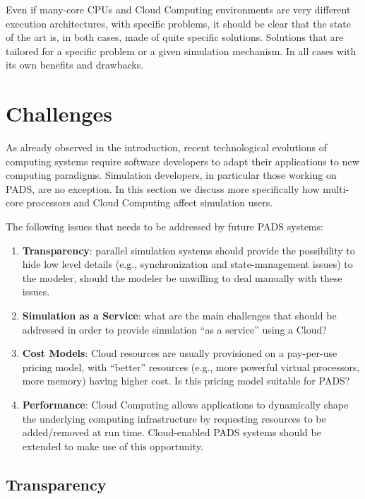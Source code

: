\documentclass[1p]{elsarticle}
\begin{document}
Even if many-core CPUs and Cloud Computing environments are very different
execution architectures, with specific problems, it should be 
clear that the state of the art is, in both cases, made of quite
specific solutions. Solutions that are tailored for a specific 
problem or a given simulation mechanism. In all cases with its 
own benefits and drawbacks.

\section{Challenges}\label{sec:challenges}

As already observed in the introduction, recent technological
evolutions of computing systems require software developers to adapt
their applications to new computing paradigms. Simulation developers,
in particular those working on PADS, are no exception. In this section
we discuss more specifically how multi-core processors and Cloud
Computing affect simulation users. 

The following issues that needs to be addressed by future PADS
systems:

\begin{enumerate}
\item \textbf{Transparency}: parallel simulation systems should provide
  the possibility to hide low level details (e.g., synchronization and
  state-management issues) to the modeler, should the modeler be
  unwilling to deal manually with these issues.
\item \textbf{Simulation as a Service}: what are the main challenges
  that should be addressed in order to provide simulation ``as a
  service'' using a Cloud?
\item \textbf{Cost Models}: Cloud resources are usually provisioned on
  a pay-per-use pricing model, with ``better'' resources (e.g., more
  powerful virtual processors, more memory) having higher cost. Is
  this pricing model suitable for PADS?
\item \textbf{Performance}: Cloud Computing allows applications to
  dynamically shape the underlying computing infrastructure by
  requesting resources to be added/removed at run time. Cloud-enabled
  PADS systems should be extended to make use of this opportunity.
\end{enumerate}


\subsection{Transparency}\label{sec:challenges.transparency}
\end{document}
